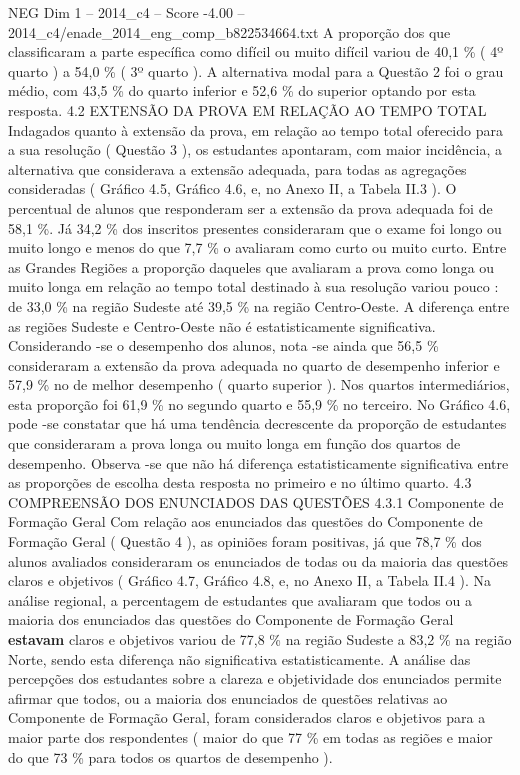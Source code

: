 \begin{textsample}{NEG Dim 1 – 2014\_c4 – Score -4.00 – 2014\_c4/enade\_2014\_eng\_comp\_b822534664.txt}
A proporção dos que classificaram a parte específica como difícil ou muito difícil variou de 40,1 \% ( 4º quarto ) a 54,0 \% ( 3º quarto ).
A alternativa modal para a Questão 2 foi o grau médio, com 43,5 \% do quarto inferior e 52,6 \% do superior optando por esta resposta. 4.2 EXTENSÃO DA PROVA EM RELAÇÃO AO TEMPO TOTAL Indagados quanto à extensão da prova, em relação ao tempo total oferecido para a sua resolução ( Questão 3 ), os estudantes apontaram, com maior incidência, a alternativa que considerava a extensão adequada, para todas as agregações consideradas ( Gráfico 4.5, Gráfico 4.6, e, no Anexo II, a Tabela II.3 ).
O percentual de alunos que responderam ser a extensão da prova adequada foi de 58,1 \%.
Já 34,2 \% dos inscritos presentes consideraram que o exame foi longo ou muito longo e menos do que 7,7 \% o avaliaram como curto ou muito curto.
Entre as Grandes Regiões a proporção daqueles que avaliaram a prova como longa ou muito longa em relação ao tempo total destinado à sua resolução variou pouco : de 33,0 \% na região Sudeste até 39,5 \% na região Centro-Oeste.
A diferença entre as regiões Sudeste e Centro-Oeste não é estatisticamente significativa.
Considerando -se o desempenho dos alunos, nota -se ainda que 56,5 \% consideraram a extensão da prova adequada no quarto de desempenho inferior e 57,9 \% no de melhor desempenho ( quarto superior ).
Nos quartos intermediários, esta proporção foi 61,9 \% no segundo quarto e 55,9 \% no terceiro.
No Gráfico 4.6, pode -se constatar que há uma tendência decrescente da proporção de estudantes que consideraram a prova longa ou muito longa em função dos quartos de desempenho.
Observa -se que não há diferença estatisticamente significativa entre as proporções de escolha desta resposta no primeiro e no último quarto. 4.3 COMPREENSÃO DOS ENUNCIADOS DAS QUESTÕES 4.3.1 Componente de Formação Geral Com relação aos enunciados das questões do Componente de Formação Geral ( Questão 4 ), as opiniões foram positivas, já que 78,7 \% dos alunos avaliados consideraram os enunciados de todas ou da maioria das questões claros e objetivos ( Gráfico 4.7, Gráfico 4.8, e, no Anexo II, a Tabela II.4 ).
Na análise regional, a percentagem de estudantes que avaliaram que todos ou a maioria dos enunciados das questões do Componente de Formação Geral \textbf{estavam} claros e objetivos variou de 77,8 \% na região Sudeste a 83,2 \% na região Norte, sendo esta diferença não significativa estatisticamente.
A análise das percepções dos estudantes sobre a clareza e objetividade dos enunciados permite afirmar que todos, ou a maioria dos enunciados de questões relativas ao Componente de Formação Geral, foram considerados claros e objetivos para a maior parte dos respondentes ( maior do que 77 \% em todas as regiões e maior do que 73 \% para todos os quartos de desempenho ).

\end{textsample}
